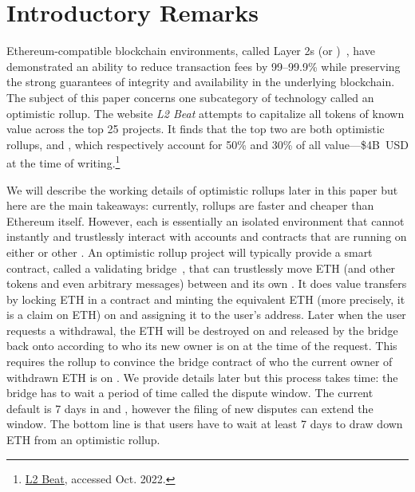 \section{Introductory Remarks}

Ethereum-compatible blockchain environments, called Layer 2s (or \layertwos)~\cite{gudgeon2019sok}, have demonstrated an ability to reduce transaction fees by 99--99.9\% while preserving the strong guarantees of integrity and availability in the underlying blockchain. The subject of this paper concerns one subcategory of \layertwo technology called an optimistic rollup. The website \textit{L2 Beat} attempts to capitalize all tokens of known value across the top 25 \layertwo projects. It finds that the top two \layertwos are both optimistic rollups, \arb and \opt, which respectively account for 50\% and 30\% of all \layertwo value---\$4B~USD at the time of writing.\footnote{\href{https://l2beat.com/scaling/tvl/}{L2 Beat}, accessed Oct. 2022.}

We will describe the working details of optimistic rollups later in this paper but here are the main takeaways: currently, rollups are faster and cheaper than Ethereum itself. However, each \layertwo is essentially an isolated environment that cannot instantly and trustlessly interact with accounts and contracts that are running on either \layerone or other \layertwos. An optimistic rollup project will typically provide a smart contract, called a validating bridge~\cite{mccorry2021sok}, that can trustlessly move ETH (and other tokens and even arbitrary messages) between \layerone and its own \layertwo. It does value transfers by locking ETH in a \layerone contract and minting the equivalent ETH (more precisely, it is a \layertwo claim on \layerone ETH) on \layertwo and assigning it to the user's \layertwo address. Later when the user requests a withdrawal, the ETH will be destroyed on \layertwo and released by the bridge back onto \layerone according to who its new owner is on \layertwo at the time of the request. This requires the rollup to convince the \layerone bridge contract of who the current owner of withdrawn ETH is on \layertwo. We provide details later but this process takes time: the bridge has to wait a period of time called the dispute window. The current default is 7 days in \arb and \opt, however the filing of new disputes can extend the window. The bottom line is that users have to wait at least 7 days to draw down ETH from an optimistic rollup. 


